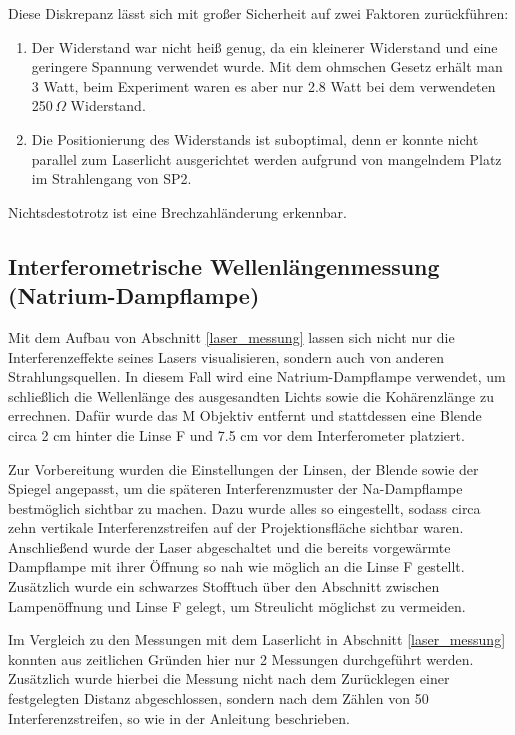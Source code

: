 \documentclass[
  headings=optiontotocandhead,
  twoside,
  openright,
  numbers=noenddot,
  toc=flat,
  11pt,
  parskip=full,
  listof=flat,
  bibliography=totoc,
  a4paper,
  DIV=14,
  BCOR=22mm,
  headheight=5mm,
  headinclude=true,
]{scrartcl}
\begin{document}
Diese Diskrepanz lässt sich mit großer Sicherheit auf zwei Faktoren zurückführen:
\begin{enumerate}
  \item Der Widerstand war nicht heiß genug, da ein kleinerer Widerstand und eine geringere Spannung verwendet wurde. Mit dem ohmschen Gesetz erhält man 3 Watt, beim Experiment waren es aber nur 2.8 Watt bei dem verwendeten 250$\, \Omega$ Widerstand.
  \item Die Positionierung des Widerstands ist suboptimal, denn er konnte nicht parallel zum Laserlicht ausgerichtet werden aufgrund von mangelndem Platz im Strahlengang von SP2.
\end{enumerate}

Nichtsdestotrotz ist eine Brechzahländerung erkennbar.

\subsection{Interferometrische Wellenlängenmessung (Natrium-Dampflampe)} \label{natrium_messung}

Mit dem Aufbau von Abschnitt \ref{laser_messung} lassen sich nicht nur die Interferenzeffekte seines Lasers visualisieren, sondern auch von anderen Strahlungsquellen. In diesem Fall wird eine Natrium-Dampflampe verwendet, um schließlich die Wellenlänge des ausgesandten Lichts sowie die Kohärenzlänge zu errechnen. Dafür wurde das M Objektiv entfernt und stattdessen eine Blende circa 2 cm hinter die Linse F und 7.5 cm vor dem Interferometer platziert.

Zur Vorbereitung wurden die Einstellungen der Linsen, der Blende sowie der Spiegel angepasst, um die späteren Interferenzmuster der Na-Dampflampe bestmöglich sichtbar zu machen. Dazu wurde alles so eingestellt, sodass circa zehn vertikale Interferenzstreifen auf der Projektionsfläche sichtbar waren. Anschließend wurde der Laser abgeschaltet und die bereits vorgewärmte Dampflampe mit ihrer Öffnung so nah wie möglich an die Linse F gestellt. Zusätzlich wurde ein schwarzes Stofftuch über den Abschnitt zwischen Lampenöffnung und Linse F gelegt, um Streulicht möglichst zu vermeiden.

Im Vergleich zu den Messungen mit dem Laserlicht in Abschnitt \ref{laser_messung} konnten aus zeitlichen Gründen hier nur 2 Messungen durchgeführt werden. Zusätzlich wurde hierbei die Messung nicht nach dem Zurücklegen einer festgelegten Distanz abgeschlossen, sondern nach dem Zählen von 50 Interferenzstreifen, so wie in der Anleitung beschrieben.
\end{document}
